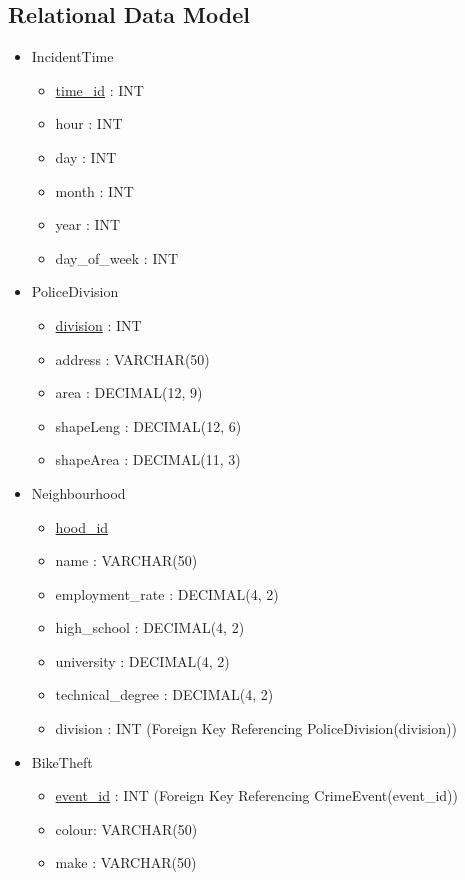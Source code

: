 \documentclass[12pt, a4paper]{article}
\begin{document}
\subsection*{Relational Data Model}
\begin{itemize}
    \item IncidentTime
    \begin{itemize}
        \item \underline{time\_id} : INT
        \item hour : INT
        \item day : INT
        \item month : INT
        \item year : INT
        \item day\_of\_week : INT
    \end{itemize}
    \item PoliceDivision
        \begin{itemize}
        \item \underline{division} : INT
        \item address : VARCHAR(50)
        \item area : DECIMAL(12, 9)
        \item shapeLeng : DECIMAL(12, 6) 
        \item shapeArea : DECIMAL(11, 3)
    \end{itemize}
    \item Neighbourhood
        \begin{itemize}
        \item \underline{hood\_id}
        \item name : VARCHAR(50)
        \item employment\_rate : DECIMAL(4, 2)
        \item high\_school : DECIMAL(4, 2)
        \item university : DECIMAL(4, 2)
        \item technical\_degree : DECIMAL(4, 2)
        \item division : INT (Foreign Key Referencing PoliceDivision(division))
    \end{itemize}
    \item BikeTheft
        \begin{itemize}
        \item \underline{event\_id} : INT (Foreign Key Referencing CrimeEvent(event\_id))
        \item colour: VARCHAR(50)
        \item make : VARCHAR(50)

\end{itemize}
\end{itemize}
\end{document}
